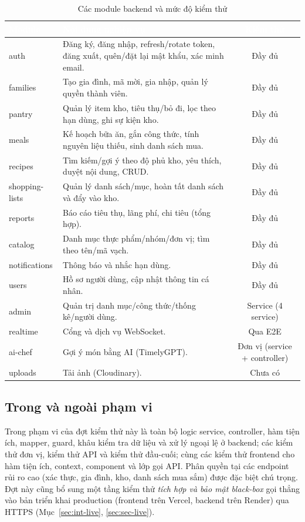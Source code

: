 \documentclass[12pt,a4paper]{article}
\newcommand{\thead}[1]{\textbf{\textcolor{white}{#1}}}
\begin{document}
\begin{table}[h]
\centering
\caption{Các module backend và mức độ kiểm thử}
\label{tab:modules}
\begin{tabularx}{\linewidth}{|l|Y|c|}
\hline
{}
\thead{Module} & \thead{Nội dung nghiệp vụ} & \thead{Kiểm thử} \\
\hline
auth & Đăng ký, đăng nhập, refresh/rotate token, đăng xuất, quên/đặt lại mật khẩu, xác minh email. & Đầy đủ \\
\hline
families & Tạo gia đình, mã mời, gia nhập, quản lý quyền thành viên. & Đầy đủ \\
\hline
pantry & Quản lý item kho, tiêu thụ/bỏ đi, lọc theo hạn dùng, ghi sự kiện kho. & Đầy đủ \\
\hline
meals & Kế hoạch bữa ăn, gắn công thức, tính nguyên liệu thiếu, sinh danh sách mua. & Đầy đủ \\
\hline
recipes & Tìm kiếm/gợi ý theo độ phủ kho, yêu thích, duyệt nội dung, CRUD. & Đầy đủ \\
\hline
shopping-lists & Quản lý danh sách/mục, hoàn tất danh sách và đẩy vào kho. & Đầy đủ \\
\hline
reports & Báo cáo tiêu thụ, lãng phí, chi tiêu (tổng hợp). & Đầy đủ \\
\hline
catalog & Danh mục thực phẩm/nhóm/đơn vị; tìm theo tên/mã vạch. & Đầy đủ \\
\hline
notifications & Thông báo và nhắc hạn dùng. & Đầy đủ \\
\hline
users & Hồ sơ người dùng, cập nhật thông tin cá nhân. & Đầy đủ \\
\hline
admin & Quản trị danh mục/công thức/thống kê/người dùng. & Service (4 service) \\
\hline
realtime & Cổng và dịch vụ WebSocket. & Qua E2E \\
\hline
ai-chef & Gợi ý món bằng AI (TimelyGPT). & Đơn vị (service + controller) \\
\hline
uploads & Tải ảnh (Cloudinary). & Chưa có \\
\hline
\end{tabularx}
\end{table}

\subsection{Trong và ngoài phạm vi}

Trong phạm vi của đợt kiểm thử này là toàn bộ logic service, controller, hàm tiện ích, mapper, guard, khâu
kiểm tra dữ liệu và xử lý ngoại lệ ở backend; các kiểm thử đơn vị, kiểm thử API và kiểm thử đầu-cuối; cùng
các kiểm thử frontend cho hàm tiện ích, context, component và lớp gọi API. Phân quyền tại các endpoint rủi
ro cao (xác thực, gia đình, kho, danh sách mua sắm) được đặc biệt chú trọng. Đợt này cũng bổ sung một tầng
kiểm thử \emph{tích hợp và bảo mật black-box} gọi thẳng vào bản triển khai production (frontend trên Vercel,
backend trên Render) qua HTTPS (Mục~\ref{sec:int-live}, \ref{sec:sec-live}).
\end{document}

